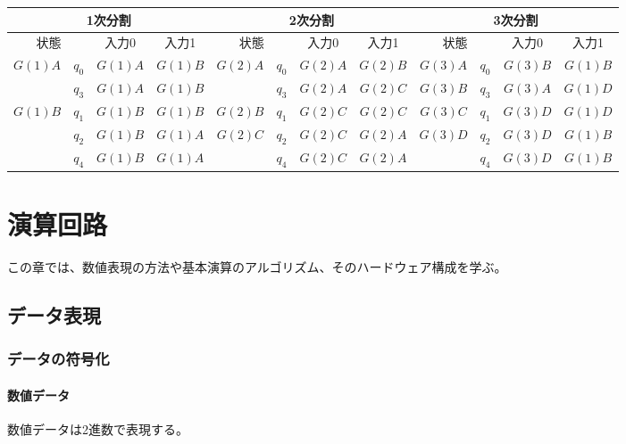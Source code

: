 \documentclass[a4j,10pt,oneside,openany,fleqn]{jsbook}
\begin{document}
\begin{table}[htb]
  \begin{center}
    \begin{tabular}{|c|c|c|c||c|c|c|c||c|c|c|c|}\hline
      \multicolumn{4}{|c||}{1次分割} & \multicolumn{4}{|c||}{2次分割} & \multicolumn{4}{|c|}{3次分割} \\ \hline \hline
      \multicolumn{2}{|c|}{状態} & \multicolumn{1}{c|}{入力0} & \multicolumn{1}{c||}{入力1} &
      \multicolumn{2}{|c|}{状態} & \multicolumn{1}{c|}{入力0} & \multicolumn{1}{c||}{入力1} &
      \multicolumn{2}{|c|}{状態} & \multicolumn{1}{c|}{入力0} & \multicolumn{1}{c||}{入力1} \\ \hline
      $G(1)A$ & $q_0$ & $G(1)A$ & $G(1)B$ &       $G(2)A$ & $q_0$ & $G(2)A$ & $G(2)B$ &       $G(3)A$ & $q_0$ & $G(3)B$ & $G(1)B$ \\ \cline{9-12}
      & $q_3$ & $G(1)A$ & $G(1)B$ &       & $q_3$ & $G(2)A$ & $G(2)C$ &       $G(3)B$ & $q_3$ & $G(3)A$ & $G(1)D$ \\ \hline
      $G(1)B$ & $q_1$ & $G(1)B$ & $G(1)B$ &       $G(2)B$ & $q_1$ & $G(2)C$ & $G(2)C$ &       $G(3)C$ & $q_1$ & $G(3)D$ & $G(1)D$ \\ \cline{5-12}
      & $q_2$ & $G(1)B$ & $G(1)A$ &       $G(2)C$ & $q_2$ & $G(2)C$ & $G(2)A$ &       $G(3)D$ & $q_2$ & $G(3)D$ & $G(1)B$ \\
      & $q_4$ & $G(1)B$ & $G(1)A$ &       & $q_4$ & $G(2)C$ & $G(2)A$ &       & $q_4$ & $G(3)D$ & $G(1)B$ \\ \hline
    \end{tabular}
  \end{center}
\end{table}

\chapter{演算回路}
この章では、数値表現の方法や基本演算のアルゴリズム、そのハードウェア構成を学ぶ。

\section{データ表現}
\subsection{データの符号化}
\subsubsection{数値データ}
数値データは2進数で表現する。
\end{document}
